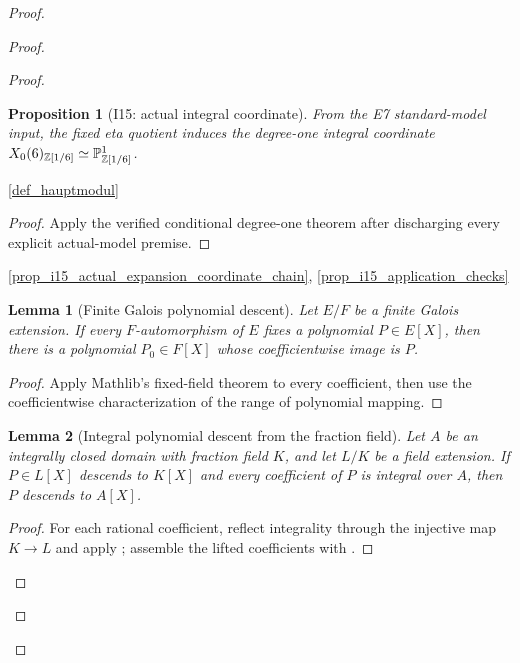 \documentclass[11pt,a4paper]{article}
\numberwithin{equation}{section}
\theoremstyle{plain}\newtheorem{theorem}{Theorem}[section]\newaliascnt{proposition}{theorem}\newtheorem{proposition}[proposition]{Proposition}\aliascntresetthe{proposition}\newaliascnt{lemma}{theorem}\newtheorem{lemma}[lemma]{Lemma}\aliascntresetthe{lemma}
\theoremstyle{definition}\newaliascnt{definition}{theorem}\newtheorem{definition}[definition]{Definition}\aliascntresetthe{definition}\newaliascnt{notation}{theorem}\newtheorem{notation}[notation]{Notation}\aliascntresetthe{notation}
\providecommand{\lean}[1]{}\providecommand{\leanok}{}
\begin{document}
\begin{proof}
\begin{proof}
\begin{proof}
\begin{proposition}[I15: actual integral coordinate]\label{prop_i15_actual_coordinate}\lean{SptCM.Repair.exists_actualHauptmodul_integral_coordinate}\leanok
From the E7 standard-model input, the fixed eta quotient induces the
degree-one integral coordinate
$X_0(6)_{\mathbb Z[1/6]}\simeq\mathbb P^1_{\mathbb Z[1/6]}$.
\end{proposition}
\begin{uses-statement}\ref{def_hauptmodul}\end{uses-statement}
\begin{proof}Apply the verified conditional degree-one theorem after discharging every explicit actual-model premise.\end{proof}
\begin{uses-proof}\ref{prop_i15_actual_expansion_coordinate_chain}, \ref{prop_i15_application_checks}\end{uses-proof}

\begin{lemma}[Finite Galois polynomial descent]\label{lem_galois_polynomial_descent}\lean{SptCM.CM.Repaired.exists_basePolynomial_of_galois_fixed}\leanok
Let $E/F$ be a finite Galois extension.  If every $F$-automorphism of $E$
fixes a polynomial $P\in E[X]$, then there is a polynomial $P_0\in F[X]$
whose coefficientwise image is $P$.
\end{lemma}
\begin{proof}
Apply Mathlib's fixed-field theorem
 to every coefficient,
then use the coefficientwise characterization of the range of polynomial
mapping.
\end{proof}

\begin{lemma}[Integral polynomial descent from the fraction field]\label{lem_integral_polynomial_descent}\lean{SptCM.CM.Repaired.exists_integrallyClosedPolynomial_of_fractional_integral}\leanok
Let $A$ be an integrally closed domain with fraction field $K$, and let
$L/K$ be a field extension.  If $P\in L[X]$ descends to $K[X]$ and every
coefficient of $P$ is integral over $A$, then $P$ descends to $A[X]$.
\end{lemma}
\begin{proof}
For each rational coefficient, reflect integrality through the injective map
$K\to L$ and apply
; assemble the lifted
coefficients with .
\end{proof}


\end{proof}
\end{proof}
\end{proof}
\end{document}
